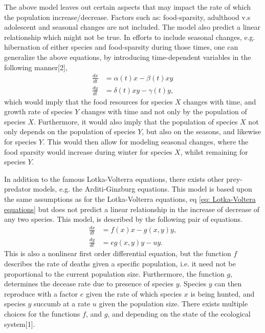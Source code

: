\documentclass[a4paper]{article}
\newcommand{\newparagraph}{\vspace{.5cm}\noindent}
\begin{document}
\newparagraph
The above model leaves out certain aspects that may impact the rate of which the population increase/decrease. Factors such as: food-sparsity, adulthood v.s adolescent and seasonal changes are not included. The model also predict a linear relationship which might not be true. In efforts to include seasonal changes, e.g. hibernation of either species and food-sparsity during those times, one can generalize the above equations, by introducing time-dependent variables in the following manner[2],
\begin{align}
    \frac{dx}{dt} &= \alpha(t) x - \beta(t) xy \nonumber\\
    \frac{dy}{dt} &= \delta(t) xy - \gamma(t) y,\label{eq: time-dependent lv}
\end{align}which would imply that the food resources for species $X$ changes with time, and growth rate of species $Y$ changes with time and not only by the population of species $X$. Furthermore, it would also imply that the population of species $X$ not only depends on the population of species $Y$, but also on the seasons, and likewise for species $Y$.
This would then allow for modeling seasonal changes, where the food sparsity would increase during winter for species $X$, whilst remaining for species $Y$.

\newparagraph
In addition to the famous Lotka-Volterra equations, there exists other prey-predator models, e.g. the Arditi-Ginzburg equations. This model is based upon the same assumptions as for the Lotka-Volterra equations, eq \eqref{eq: Lotka-Voltera equations} but does not predict a linear relationship in the increase of decrease of any two species. This model, is described by the following pair of equations.
\begin{align}
    \frac{dx}{dt} &= f(x)x - g\left(x,y\right) y,\nonumber\\
    \frac{dy}{dt} &= eg\left(x,y\right)y - uy.\label{eq: ag}
\end{align}This is also a nonlinear first order differential equation, but the function $f$ describes the rate of deaths given a specific population, i.e. it need not be proportional to the current population size. Furthermore, the function $g$, determines the decease rate due to presence of species $y$. Species $y$ can then reproduce with a factor $e$ given the rate of which species $x$ is being hunted, and species $y$ succumb at a rate $u$ given the population size. There exists multiple choices for the functions $f$, and $g$, and depending on the state of the ecological system[1].
\end{document}
